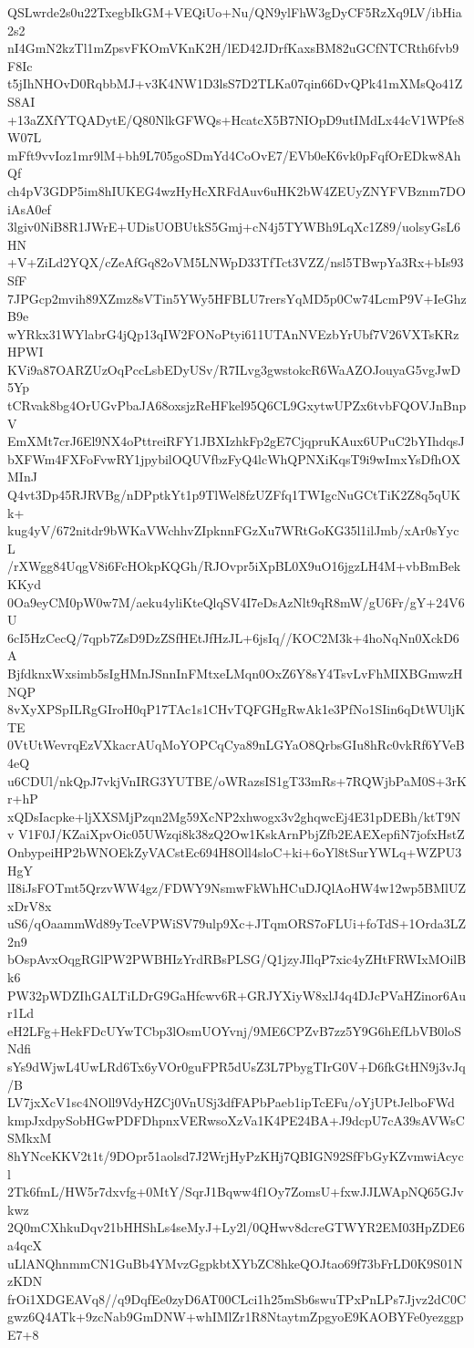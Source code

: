 QSLwrde2s0u22TxegbIkGM+VEQiUo+Nu/QN9ylFhW3gDyCF5RzXq9LV/ibHia2s2
nI4GmN2kzTl1mZpsvFKOmVKnK2H/lED42JDrfKaxsBM82uGCfNTCRth6fvb9F8Ic
t5jIhNHOvD0RqbbMJ+v3K4NW1D3lsS7D2TLKa07qin66DvQPk41mXMsQo41ZS8AI
+13aZXfYTQADytE/Q80NlkGFWQs+HcatcX5B7NIOpD9utIMdLx44cV1WPfe8W07L
mFft9vvIoz1mr9lM+bh9L705goSDmYd4CoOvE7/EVb0eK6vk0pFqfOrEDkw8AhQf
ch4pV3GDP5im8hIUKEG4wzHyHcXRFdAuv6uHK2bW4ZEUyZNYFVBznm7DOiAsA0ef
3lgiv0NiB8R1JWrE+UDisUOBUtkS5Gmj+cN4j5TYWBh9LqXc1Z89/uolsyGsL6HN
+V+ZiLd2YQX/cZeAfGq82oVM5LNWpD33TfTct3VZZ/nsl5TBwpYa3Rx+bIs93SfF
7JPGcp2mvih89XZmz8sVTin5YWy5HFBLU7rersYqMD5p0Cw74LcmP9V+IeGhzB9e
wYRkx31WYlabrG4jQp13qIW2FONoPtyi611UTAnNVEzbYrUbf7V26VXTsKRzHPWI
KVi9a87OARZUzOqPccLsbEDyUSv/R7ILvg3gwstokcR6WaAZOJouyaG5vgJwD5Yp
tCRvak8bg4OrUGvPbaJA68oxsjzReHFkel95Q6CL9GxytwUPZx6tvbFQOVJnBnpV
EmXMt7crJ6El9NX4oPttreiRFY1JBXIzhkFp2gE7CjqpruKAux6UPuC2bYIhdqsJ
bXFWm4FXFoFvwRY1jpybilOQUVfbzFyQ4lcWhQPNXiKqsT9i9wImxYsDfhOXMInJ
Q4vt3Dp45RJRVBg/nDPptkYt1p9TlWel8fzUZFfq1TWIgcNuGCtTiK2Z8q5qUKk+
kug4yV/672nitdr9bWKaVWchhvZIpknnFGzXu7WRtGoKG35l1ilJmb/xAr0sYycL
/rXWgg84UqgV8i6FcHOkpKQGh/RJOvpr5iXpBL0X9uO16jgzLH4M+vbBmBekKKyd
0Oa9eyCM0pW0w7M/aeku4yliKteQlqSV4I7eDsAzNlt9qR8mW/gU6Fr/gY+24V6U
6cI5HzCecQ/7qpb7ZsD9DzZSfHEtJfHzJL+6jsIq//KOC2M3k+4hoNqNn0XckD6A
BjfdknxWxsimb5sIgHMnJSnnInFMtxeLMqn0OxZ6Y8sY4TsvLvFhMIXBGmwzHNQP
8vXyXPSpILRgGIroH0qP17TAc1s1CHvTQFGHgRwAk1e3PfNo1SIin6qDtWUljKTE
0VtUtWevrqEzVXkacrAUqMoYOPCqCya89nLGYaO8QrbsGIu8hRc0vkRf6YVeB4eQ
u6CDUl/nkQpJ7vkjVnIRG3YUTBE/oWRazsIS1gT33mRs+7RQWjbPaM0S+3rKr+hP
xQDsIacpke+ljXXSMjPzqn2Mg59XcNP2xhwogx3v2ghqwcEj4E31pDEBh/ktT9Nv
V1F0J/KZaiXpvOic05UWzqi8k38zQ2Ow1KskArnPbjZfb2EAEXepfiN7jofxHstZ
OnbypeiHP2bWNOEkZyVACstEc694H8Oll4sloC+ki+6oYl8tSurYWLq+WZPU3HgY
lI8iJsFOTmt5QrzvWW4gz/FDWY9NsmwFkWhHCuDJQlAoHW4w12wp5BMlUZxDrV8x
uS6/qOaammWd89yTceVPWiSV79ulp9Xc+JTqmORS7oFLUi+foTdS+1Orda3LZ2n9
bOspAvxOqgRGlPW2PWBHIzYrdRBsPLSG/Q1jzyJIlqP7xic4yZHtFRWIxMOilBk6
PW32pWDZIhGALTiLDrG9GaHfcwv6R+GRJYXiyW8xlJ4q4DJcPVaHZinor6Aur1Ld
eH2LFg+HekFDcUYwTCbp3lOsmUOYvnj/9ME6CPZvB7zz5Y9G6hEfLbVB0loSNdfi
sYs9dWjwL4UwLRd6Tx6yVOr0guFPR5dUsZ3L7PbygTIrG0V+D6fkGtHN9j3vJq/B
LV7jxXcV1sc4NOll9VdyHZCj0VnUSj3dfFAPbPaeb1ipTcEFu/oYjUPtJelboFWd
kmpJxdpySobHGwPDFDhpnxVERwsoXzVa1K4PE24BA+J9dcpU7cA39sAVWsCSMkxM
8hYNceKKV2t1t/9DOpr51aolsd7J2WrjHyPzKHj7QBIGN92SfFbGyKZvmwiAcycl
2Tk6fmL/HW5r7dxvfg+0MtY/SqrJ1Bqww4f1Oy7ZomsU+fxwJJLWApNQ65GJvkwz
2Q0mCXhkuDqv21bHHShLs4seMyJ+Ly2l/0QHwv8dcreGTWYR2EM03HpZDE6a4qcX
uLlANQhnmmCN1GuBb4YMvzGgpkbtXYbZC8hkeQOJtao69f73bFrLD0K9S01NzKDN
frOi1XDGEAVq8//q9DqfEe0zyD6AT00CLci1h25mSb6swuTPxPnLPs7Jjvz2dC0C
gwz6Q4ATk+9zcNab9GmDNW+whIMlZr1R8NtaytmZpgyoE9KAOBYFe0yezggpE7+8
